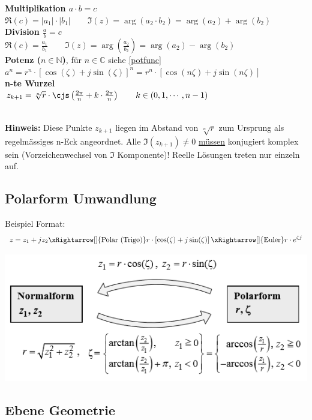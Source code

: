 \noindent\textbf{Multiplikation $a \cdot b = c$}\\
$\Re(c) = |a_1| \cdot |b_1| \qquad \Im(z) = \arg(a_2 \cdot b_2) = \arg(a_2) + \arg(b_2)$\\

\noindent\textbf{Division  $\frac{a}{b} = c$}\\
$\Re(c) = \frac{a_1}{b_1} \qquad \Im(z) = \arg(\frac{a_2}{b_2}) = \arg(a_2) - \arg(b_2)$\\

\noindent\textbf{Potenz ($n \in \mathbb{N}$)}, für $n \in \mathbb{C}$ siehe \ref{potfunc}\\
$a^n = r^n \cdot [\cos(\zeta) + j\sin(\zeta)]^n = r^n \cdot [\cos(n\zeta) + j\sin(n\zeta)]$\\

\noindent\textbf{n-te Wurzel}\\
$z_{k+1} = \sqrt[n]{r} \cdot \cjs\left(\frac{2\pi}{n} + k \cdot \frac{2\pi}{n}\right) \qquad k \in (0, 1, \cdots, n-1)$

~\\
\noindent\textbf{Hinweis:} Diese Punkte $z_{k+1}$ liegen im Abstand von $\sqrt[n]{r}$ zum Ursprung als regelmässiges n-Eck angeordnet. Alle $\Im(z_{k+1}) \neq 0$ \underline{müssen} konjugiert komplex sein (Vorzeichenwechsel von $\Im$ Komponente)! Reelle Lösungen treten nur einzeln auf. 

\subsection{Polarform Umwandlung}
Beispiel Format:
\[
z = z_1+ jz_2 \xRightarrow[]{\text{Polar (Trigo)}} r \cdot \left[\cos(\zeta) + j\sin(\zeta)\right] \xRightarrow[]{\text{Euler}} r \cdot e^{\zeta j}
\]
\begin{center}
	\includegraphics[width=0.6\columnwidth]{Images/umwandlung}
\end{center}

\subsection{Ebene Geometrie}
